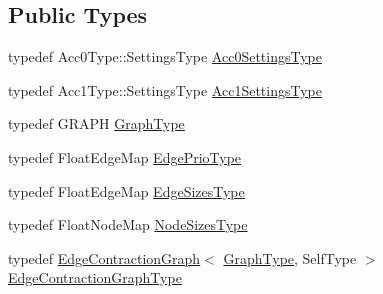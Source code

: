 \subsection*{Public Types}
\begin{DoxyCompactItemize}
\item 
typedef Acc0\+Type\+::\+Settings\+Type \hyperlink{classnifty_1_1graph_1_1agglo_1_1ProbabilisticLiftedClusterPolicy_a09fe3ffd1a828f90b14da010c525fce5}{Acc0\+Settings\+Type}
\item 
typedef Acc1\+Type\+::\+Settings\+Type \hyperlink{classnifty_1_1graph_1_1agglo_1_1ProbabilisticLiftedClusterPolicy_a4ecb3159c4d99c52bd145ce470d07cb8}{Acc1\+Settings\+Type}
\item 
typedef G\+R\+A\+PH \hyperlink{classnifty_1_1graph_1_1agglo_1_1ProbabilisticLiftedClusterPolicy_a196d3d530d5eed9f8a40172dcd93fa41}{Graph\+Type}
\item 
typedef Float\+Edge\+Map \hyperlink{classnifty_1_1graph_1_1agglo_1_1ProbabilisticLiftedClusterPolicy_ace81e94cdcbc05507645b724a12adec3}{Edge\+Prio\+Type}
\item 
typedef Float\+Edge\+Map \hyperlink{classnifty_1_1graph_1_1agglo_1_1ProbabilisticLiftedClusterPolicy_a8d978f1a75c207cb7492dd0e576d78d1}{Edge\+Sizes\+Type}
\item 
typedef Float\+Node\+Map \hyperlink{classnifty_1_1graph_1_1agglo_1_1ProbabilisticLiftedClusterPolicy_ae92bc42e274c38e719aa47b38d3399f5}{Node\+Sizes\+Type}
\item 
typedef \hyperlink{classnifty_1_1graph_1_1EdgeContractionGraph}{Edge\+Contraction\+Graph}$<$ \hyperlink{classnifty_1_1graph_1_1agglo_1_1ProbabilisticLiftedClusterPolicy_a196d3d530d5eed9f8a40172dcd93fa41}{Graph\+Type}, Self\+Type $>$ \hyperlink{classnifty_1_1graph_1_1agglo_1_1ProbabilisticLiftedClusterPolicy_a328efe50fff8d430a835e8ffc50ba60f}{Edge\+Contraction\+Graph\+Type}
\end{DoxyCompactItemize}
